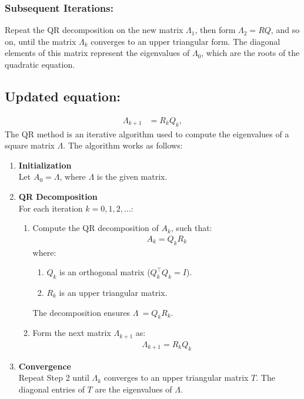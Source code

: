 \documentclass[journal]{IEEEtran}
\begin{document}
\subsubsection*{Subsequent Iterations:}
Repeat the QR decomposition on the new matrix \( \Lambda_1 \), then form \( \Lambda_2 = RQ \), and so on, until the matrix \( \Lambda_k \) converges to an upper triangular form. The diagonal elements of this matrix represent the eigenvalues of \( \Lambda_0 \), which are the roots of the quadratic equation.
\subsection*{Updated equation:}
\begin{align}
    \Lambda_{k+1} &= R_k Q_k,
\end{align}
The QR method is an iterative algorithm used to compute the eigenvalues of a square matrix \(\Lambda\). The algorithm works as follows:

\begin{enumerate}
    \item \textbf{Initialization}\\
    Let \(A_0 = \Lambda\), where \(\Lambda\) is the given matrix.
    \item \textbf{QR Decomposition}\\
    For each iteration \(k = 0, 1, 2, \dots\):
    \begin{enumerate}
        \item Compute the QR decomposition of \(A_k\), such that:
        \begin{align}
        A_k = Q_k R_k \tag{1.17}
        \end{align}
        where:
        \begin{enumerate}
            \item \(Q_k\) is an orthogonal matrix (\(Q_k^\top Q_k = I\)).
            \item \(R_k\) is an upper triangular matrix.
        \end{enumerate}
        The decomposition ensures \(\Lambda\ = Q_k R_k\).
        \item Form the next matrix \(\Lambda_{k+1}\) as:
        \begin{align}
        \Lambda_{k+1} = R_k Q_k \tag{1.18}
        \end{align}
    \end{enumerate}
    \item \textbf{Convergence}\\
    Repeat Step 2 until \(\Lambda_k\) converges to an upper triangular matrix \(T\). The diagonal entries of \(T\) are the eigenvalues of \(\Lambda\).
\end{enumerate}
\end{document}
